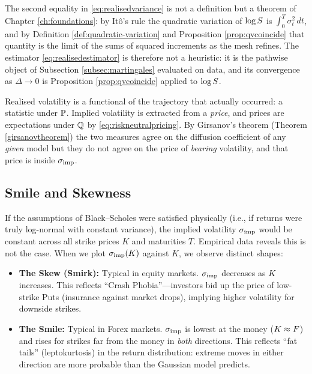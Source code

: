 The second equality in \eqref{eq:realisedvariance} is not a definition but a theorem of Chapter
\ref{ch:foundations}: by Itô's rule the quadratic variation of $\log S$ is
$\int_0^T\sigma_t^2\,dt$, and by Definition \ref{def:quadratic-variation} and Proposition
\ref{prop:qvcoincide} that quantity is the limit of the sums of squared increments as the mesh
refines. The estimator \eqref{eq:realisedestimator} is therefore not a heuristic: it is the pathwise
object of Subsection \ref{subsec:martingales} evaluated on data, and its convergence as
$\Delta \to 0$ is Proposition \ref{prop:qvcoincide} applied to $\log S$.


Realised volatility is a functional of the trajectory that actually
    occurred: a statistic under $\mathbb{P}$. Implied volatility is extracted from a \emph{price}, and
    prices are expectations under $\mathbb{Q}$ by \eqref{eq:riskneutralpricing}. By Girsanov's theorem
    (Theorem \ref{girsanovtheorem}) the two measures agree on the diffusion coefficient of any
    \emph{given} model
    but they do not agree on the price of \emph{bearing} volatility, and that price is inside
    $\sigma_{\mathrm{imp}}$.
 

\subsection{Smile and Skewness}
\label{subsec:smile_skew}

If the assumptions of Black--Scholes were satisfied physically (i.e., if returns were truly log-normal with constant variance), the implied volatility $\sigma_{\mathrm{imp}}$ would be constant across all strike prices $K$ and maturities $T$. Empirical data reveals this is not the case. When we plot $\sigma_{\mathrm{imp}}(K)$ against $K$, we observe distinct shapes:
\begin{itemize}
    \item \textbf{The Skew (Smirk):} Typical in equity markets. $\sigma_{\mathrm{imp}}$ decreases as $K$ increases. This reflects ``Crash Phobia''---investors bid up the price of low-strike Puts (insurance against market drops), implying higher volatility for downside strikes.
    \item \textbf{The Smile:} Typical in Forex markets. $\sigma_{\mathrm{imp}}$ is lowest at the money ($K \approx F$) and rises for strikes far from the money in \emph{both} directions. This reflects ``fat tails'' (leptokurtosis) in the return distribution: extreme moves in either direction are more probable than the Gaussian model predicts.
\end{itemize}

